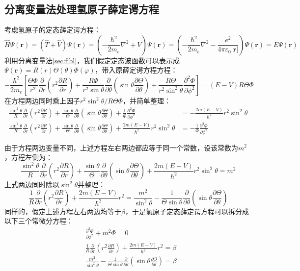 \subsection{分离变量法处理氢原子薛定谔方程}
考虑氢原子的定态薛定谔方程：
\[\hat{H}\Psi(\mathbf{r})=(\hat{T}+\hat{V})\Psi(\mathbf{r})=\left(-\frac{\hbar^2}{2m_e}\nabla^2+V\right)\Psi(\mathbf{r})=\left(-\frac{\hbar^2}{2m_e}\nabla^2-\frac{e^2}{4\pi\varepsilon_0|\mathbf{r}|}\right)\Psi(\mathbf{r})=E\Psi(\mathbf{r})\]
利用分离变量法\ref{sec:flbl}，我们假定定态波函数可以表示成$\Psi(\mathbf{r})=R(r)\Theta(\theta)\varPhi(\varphi)$，带入原薛定谔方程方程：
\[-\frac{\hbar^2}{2m_e}\left[\frac{\Theta\varPhi}{r^2}\frac{\partial}{\partial{r}}(r^2\frac{\partial R}{\partial{r}})+\frac{R\varPhi}{r^2\sin\theta}\frac{\partial}{\partial{\theta}}(\sin\theta\frac{\partial \Theta}{\partial{\theta}})+\frac{R\Theta}{r^2\sin^2 \theta }\frac{\partial^2 \varPhi}{\partial{\phi^2}}\right]=(E-V)R\Theta\varPhi\]
在方程两边同时乘上因子$r^2\sin^2 \theta/R\Theta\varPhi$，并简单整理：
\begin{equation*}
\begin{aligned}
\frac{\sin^2 \theta}{R}\frac{\partial}{\partial{r}}(r^2\frac{\partial R}{\partial{r}})+\frac{\sin\theta}{\Theta}\frac{\partial}{\partial{\theta}}(\sin\theta\frac{\partial \Theta}{\partial{\theta}})+\frac{1}{\varPhi}\frac{\partial^2 \varPhi}{\partial{\phi^2}}&=-\frac{2m(E-V)}{\hbar^2}r^2\sin^2 \theta\\
\frac{\sin^2 \theta}{R}\frac{\partial}{\partial{r}}(r^2\frac{\partial R}{\partial{r}})+\frac{\sin\theta}{\Theta}\frac{\partial}{\partial{\theta}}(\sin\theta\frac{\partial \Theta}{\partial{\theta}})+\frac{2m(E-V)}{\hbar^2}r^2\sin^2 \theta&=-\frac{1}{\varPhi}\frac{\partial^2 \varPhi}{\partial{\phi^2}}
\end{aligned}
\end{equation*}

由于方程两边变量不同，上述方程左右两边都应等于同一个常数，设该常数为$m^2$，方程左侧为：
\[\frac{\sin^2 \theta}{R}\frac{\partial}{\partial{r}}(r^2\frac{\partial R}{\partial{r}})+\frac{\sin\theta}{\Theta}\frac{\partial}{\partial{\theta}}(\sin\theta\frac{\partial \Theta}{\partial{\theta}})+\frac{2m(E-V)}{\hbar^2}r^2\sin^2 \theta=m^2\]
上式两边同时除以$\sin^2\theta$并整理：
\[\frac{1}{R}\frac{\partial}{\partial{r}}(r^2\frac{\partial R}{\partial{r}})+\frac{2m(E-V)}{\hbar^2}r^2=\frac{m^2}{\sin^2 \theta}-\frac{1}{\Theta \sin\theta}\frac{\partial}{\partial{\theta}}(\sin\theta\frac{\partial \Theta}{\partial{\theta}})\]
同样的，假定上述方程左右两边均等于$\beta$，于是氢原子定态薛定谔方程可以拆分成以下三个常微分方程：
\begin{subequations}
\begin{align}
&\frac{\partial^2 \varPhi}{\partial{\phi^2}}+m^2\varPhi=0 \label{eq:1.17_a}\\
&\frac{1}{R}\frac{\partial}{\partial{r}}(r^2\frac{\partial R}{\partial{r}})+\frac{2m(E-V)}{\hbar^2}r^2=\beta \label{eq:1.17_b}\\
&\frac{m^2}{\sin^2 \theta}-\frac{1}{\Theta \sin\theta}\frac{\partial}{\partial{\theta}}(\sin\theta\frac{\partial \Theta}{\partial{\theta}})=\beta \label{eq:1.17_c}
\end{align}
\end{subequations}

